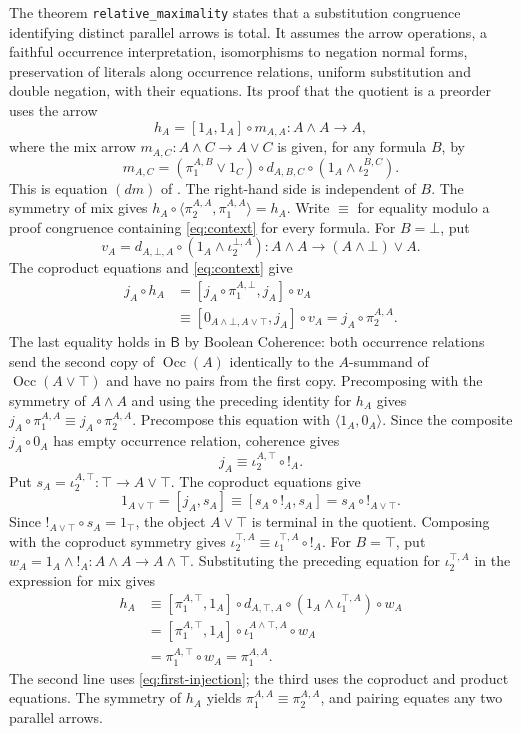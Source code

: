 \documentclass[11pt]{article}
\newcommand{\B}{\mathsf B}
\newcommand{\Occ}{\operatorname{Occ}}
\begin{document}
The theorem \texttt{relative\_maximality} states that a
substitution congruence identifying distinct parallel arrows is total.
It assumes the arrow operations, a faithful occurrence interpretation,
isomorphisms to negation normal forms, preservation of literals
along occurrence relations, uniform substitution and double
negation, with their equations.
Its proof that the quotient is a preorder uses the arrow
\[
 h_A=[1_A,1_A]\circ m_{A,A}:A\wedge A\longrightarrow A,
\]
where the mix arrow $m_{A,C}:A\wedge C\to A\vee C$ is given, for any
formula $B$, by
\[
 m_{A,C}=(\pi_1^{A,B}\vee1_C)\circ d_{A,B,C}
              \circ(1_A\wedge\iota_2^{B,C}).
\]
This is equation $(dm)$ of \cite[\S11.1, p.~234]{DP}.
The right-hand side is independent of $B$. The symmetry of mix gives
$h_A\circ\langle\pi_2^{A,A},\pi_1^{A,A}\rangle=h_A$.
Write $\equiv$ for equality modulo a proof congruence containing \eqref{eq:context}
for every formula. For $B=\bot$, put
\[
 v_A=d_{A,\bot,A}\circ(1_A\wedge\iota_2^{\bot,A})
 :A\wedge A\longrightarrow(A\wedge\bot)\vee A.
\]
The coproduct equations and \eqref{eq:context} give
\[
 \begin{aligned}
 j_A\circ h_A
 &= [j_A\circ\pi_1^{A,\bot},j_A]\circ v_A\\
 &\equiv[0_{A\wedge\bot,A\vee\top},j_A]\circ v_A
  =j_A\circ\pi_2^{A,A}.
 \end{aligned}
\]
The last equality holds in $\B$ by Boolean Coherence: both occurrence
relations send the second copy of $\Occ(A)$ identically to the
$A$-summand of $\Occ(A\vee\top)$ and have no pairs from the first copy.
Precomposing with the symmetry of $A\wedge A$ and using the
preceding identity for $h_A$ gives
$j_A\circ\pi_1^{A,A}\equiv j_A\circ\pi_2^{A,A}$.
Precompose this equation with $\langle1_A,0_A\rangle$. Since the
composite $j_A\circ0_A$ has empty occurrence relation, coherence gives
\[
 j_A\equiv\iota_2^{A,\top}\circ!_A.
\]
Put $s_A=\iota_2^{A,\top}:\top\to A\vee\top$. The coproduct
equations give
\[
 1_{A\vee\top}=[j_A,s_A]
   \equiv[s_A\circ!_A,s_A]=s_A\circ!_{A\vee\top}.
\]
Since $!_{A\vee\top}\circ s_A=1_\top$, the object $A\vee\top$ is
terminal in the quotient. Composing with the coproduct symmetry gives
$\iota_2^{\top,A}\equiv\iota_1^{\top,A}\circ!_A$.
For $B=\top$, put
$w_A=1_A\wedge!_A:A\wedge A\to A\wedge\top$. Substituting the
preceding equation for $\iota_2^{\top,A}$ in the expression for mix gives
\[
 \begin{aligned}
 h_A&\equiv[\pi_1^{A,\top},1_A]\circ d_{A,\top,A}
             \circ(1_A\wedge\iota_1^{\top,A})\circ w_A\\
    &=[\pi_1^{A,\top},1_A]\circ\iota_1^{A\wedge\top,A}\circ w_A\\
    &=\pi_1^{A,\top}\circ w_A=\pi_1^{A,A}.
 \end{aligned}
\]
The second line uses \eqref{eq:first-injection}; the third uses the
coproduct and product equations. The symmetry of $h_A$ yields $\pi_1^{A,A}\equiv\pi_2^{A,A}$,
and pairing equates any two parallel arrows.
\end{document}
